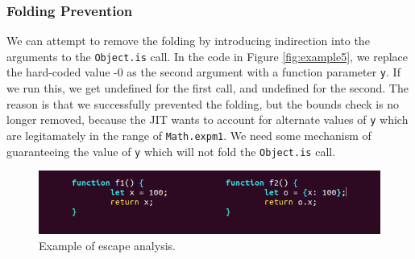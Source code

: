 \documentclass[11pt]{article}
\begin{document}
\subsubsection{Folding Prevention}
We can attempt to remove the folding by introducing indirection into the arguments to the
\texttt{Object.is} call. In the code in Figure \ref{fig:example5}, we replace the hard-coded value
-0 as the second argument with a function parameter \texttt{y}. If we run this, we get undefined for
the first call, and undefined for the second. The reason is that we successfully prevented the
folding, but the bounds check is no longer removed, because the JIT wants to account for alternate
values of \texttt{y} which are legitamately in the range of \texttt{Math.expm1}. We need some
mechanism of guaranteeing the value of \texttt{y} which will not fold the \texttt{Object.is} call.

\begin{figure}
	\centering
	\includegraphics[width=400pt]{example4.png}
	\caption{Example of escape analysis.}
  \label{fig:example4}
\end{figure}
\end{document}
